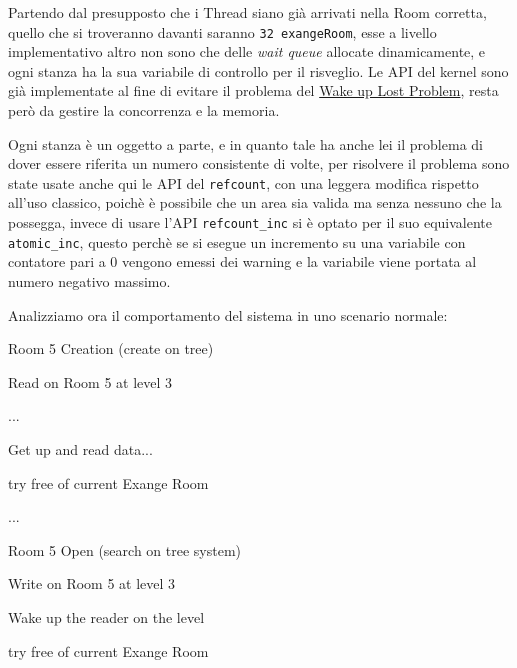 Partendo dal presupposto che i Thread siano già arrivati nella Room corretta, quello che si troveranno davanti saranno
\texttt{32 exangeRoom}, esse a livello implementativo altro non sono che delle \textit{wait queue} allocate
dinamicamente, e ogni stanza ha la sua variabile di controllo per il risveglio. Le API del kernel sono già implementate
al fine di evitare il problema del \underline{Wake up Lost Problem}, resta però da gestire la concorrenza e la memoria.

Ogni stanza è un oggetto a parte, e in quanto tale ha anche lei il problema di dover essere riferita un numero
consistente di volte, per risolvere il problema sono state usate anche qui le API del \texttt{refcount}, con una
leggera modifica rispetto all'uso classico, poichè è possibile che un area sia valida ma senza nessuno che la possegga,
invece di usare l'API \verb|refcount_inc| si è optato per il suo equivalente \verb|atomic_inc|, questo perchè se si
esegue un incremento su una variabile con contatore pari a 0 vengono emessi dei warning e la variabile viene portata al
numero negativo massimo.

Analizziamo ora il comportamento del sistema in uno scenario normale:

\begin{itemize}[label=]
\begin{minipage}{0.45\linewidth}%
    \item Room  5 Creation (create on tree)
    \item Read on Room 5 at level 3
    \item ...
    \item Get up and read data...
    \item try free of current Exange Room
\end{minipage}%
\begin{minipage}{0.10\linewidth}%
\hfill%
\end{minipage}%
\begin{minipage}{0.45\linewidth}%
    \item ...
    \item Room  5 Open (search on tree system)
    \item Write on Room 5 at level 3
    \item Wake up the reader on the level
    \item try free of current Exange Room
\end{minipage}
\end{itemize}

